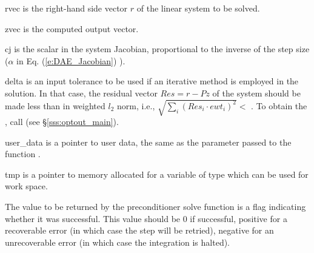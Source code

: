 {{\begin{args}
  \item[rvec]
    is the right-hand side vector $r$ of the linear system to be solved.
  \item[zvec]
    is the computed output vector.
  \item[cj]
    is the scalar in the system Jacobian, proportional to the inverse of the
    step size ($\alpha$ in Eq. (\ref{e:DAE_Jacobian}) ).
  \item[delta]
    is an input tolerance to be used if an iterative method 
    is employed in the solution.  In that case, the residual 
    vector $Res = r - P z$ of the system should be made less than 
     in weighted $l_2$ norm,     
    i.e., $\sqrt{\sum_i (Res_i \cdot ewt_i)^2 } <$ .
    To obtain the  , call  
    (see \S\ref{sss:optout_main}).
  \item[user\_data]
    is a pointer to user data, the same as the       
    parameter passed to the function .
  \item[tmp]
    is a pointer to memory allocated for a variable of type    
     which can be used for work space.
  \end{args}
}
{
  The value to be returned by the preconditioner solve function is a flag
  indicating whether it was successful.  This value should be $0$ if successful, 
  positive for a recoverable error (in which case the step will be retried),     
  negative for an unrecoverable error (in which case the integration is halted). 
}
{}
}
